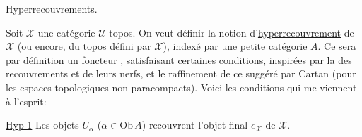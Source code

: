 
Hyperrecouvrements.

Soit $\mathcal X$ une catégorie $\mathcal U$-topos. On veut définir  la notion d'\uline{hyperrecouvrement} de $\mathcal X$ (ou encore, du topos défini par $\mathcal X$), indexé par une petite catégorie $A$.  Ce sera par définition un foncteur
, satisfaisant certaines conditions, inspirées par la   des recouvrements et de leurs nerfs, et le raffinement de ce  suggéré par Cartan (pour les espaces topologiques non paracompacts). Voici les conditions qui me viennent à l'esprit:

\uline{Hyp 1} Les objets $U_\alpha$ ($\alpha\in\mathrm{Ob}\,A$) recouvrent l'objet final $e_{\mathcal X}$ de $\mathcal X$.

